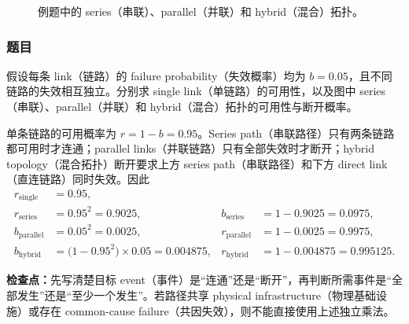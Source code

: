 \begin{figure}[htbp]
  \centering
  \resizebox{\textwidth}{!}{}
  \caption{例题中的 series（串联）、parallel（并联）和 hybrid（混合）拓扑。}
  \label{fig:sc2008-l01-availability-topologies}
\end{figure}

\subsubsection*{题目}

假设每条 link（链路）的 failure probability（失效概率）均为 $b=0.05$，且不同链路的失效相互独立。分别求 single link（单链路）的可用性，以及图中 series（串联）、parallel（并联）和 hybrid（混合）拓扑的可用性与断开概率。

\begin{workedsolution}
单条链路的可用概率为 $r=1-b=0.95$。Series path（串联路径）只有两条链路都可用时才连通；parallel links（并联链路）只有全部失效时才断开；hybrid topology（混合拓扑）断开要求上方 series path（串联路径）和下方 direct link（直连链路）同时失效。因此
\begin{align*}
  r_{\mathrm{single}}
    &=0.95,\\
  r_{\mathrm{series}}
    &=0.95^2=0.9025,
  &b_{\mathrm{series}}
    &=1-0.9025=0.0975,\\
  b_{\mathrm{parallel}}
    &=0.05^2=0.0025,
  &r_{\mathrm{parallel}}
    &=1-0.0025=0.9975,\\
  b_{\mathrm{hybrid}}
    &=\bigl(1-0.95^2\bigr)\times0.05=0.004875,
  &r_{\mathrm{hybrid}}
    &=1-0.004875=0.995125.
\end{align*}
\end{workedsolution}

\textbf{检查点：}先写清楚目标 event（事件）是“连通”还是“断开”，再判断所需事件是“全部发生”还是“至少一个发生”。若路径共享 physical infrastructure（物理基础设施）或存在 common-cause failure（共因失效），则不能直接使用上述独立乘法。
